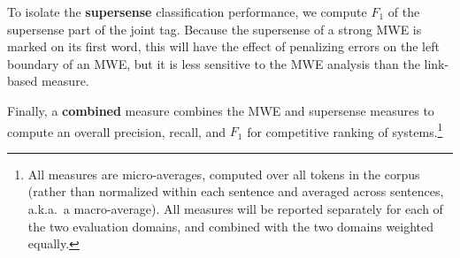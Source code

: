 \documentclass[11pt]{article}
\newcommand{\ensuretext}[1]{#1}
\newcommand{\nssmarker}{\ensuretext{\textcolor{magenta}{\ensuremath{^{\textsc{NS}}_{\textsc{S}}}}}}
\newcommand{\arkcomment}[3]{\ensuretext{\textcolor{#3}{[#1 #2]}}}
\newcommand{\nss}[1]{\arkcomment{\nssmarker}{#1}{magenta}}
\newcommand{\finalversion}[1]{}
\newcommand{\longversion}[1]{#1} %
\begin{document}
To isolate the \textbf{supersense} classification performance, 
we compute $F_1$ of the supersense part of the joint tag.\longversion{
Because the supersense of a strong MWE is marked on its first word, 
this will have the effect of penalizing errors on the left boundary of an MWE, 
but it is less sensitive to the MWE analysis than the link-based measure.}

\finalversion{\nss{consider alternate combined measure:}
The third measure is a hybrid of the first two: it computes \textbf{overall} performance 
in terms of link-based $F_1$, where for each supersense label, 
a self-link encoding that label is added to the first word of the expression.
Credit is only given for a self-link if in the other analysis, 
a corresponding self-link occurs with the same supersense.\nss{short:}}
Finally, a \textbf{combined} measure combines the MWE and supersense measures 
to compute an overall precision, recall, and $F_1$
for competitive ranking of systems.\footnote{All measures are micro-averages, 
computed over all tokens in the corpus 
(rather than normalized within each sentence and averaged across sentences, a.k.a.~a macro-average).
All measures will be reported separately for each of the two evaluation domains, 
and combined with the two domains weighted equally.}


\end{document}
